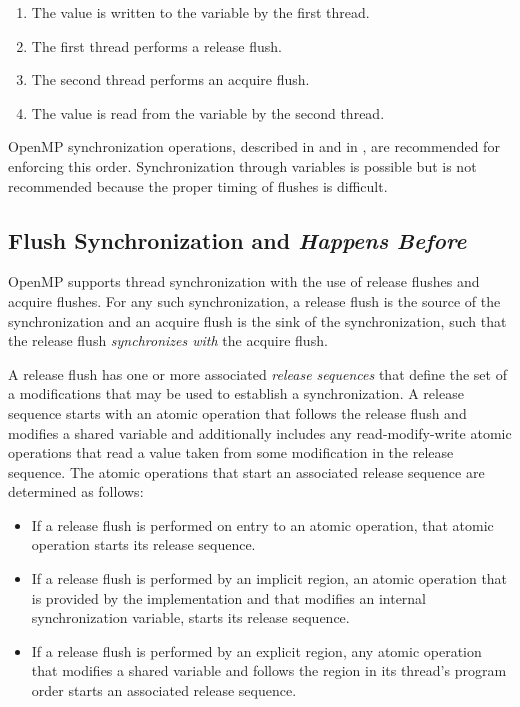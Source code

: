 \begin{enumerate}
    \item The value is written to the variable by the first thread.
    \item The first thread performs a release flush.
    \item The second thread performs an acquire flush.
    \item The value is read from the variable by the second thread.
\end{enumerate}

\begin{note}
OpenMP synchronization operations, described in 
 and in 
, are recommended for enforcing this 
order. Synchronization through variables is possible but is not 
recommended because the proper timing of flushes is difficult.
\end{note}


\subsection{Flush Synchronization and \emph{Happens Before}}
\label{subsec:happens-before}

OpenMP supports thread synchronization with the use of release flushes and
acquire flushes. For any such synchronization, a release flush is the source
of the synchronization and an acquire flush is the sink of the
synchronization, such that the release flush \emph{synchronizes with} the
acquire flush.

A release flush has one or more associated \emph{release sequences} that
define the set of a modifications that may be used to establish a
synchronization. A release sequence starts with an atomic operation
that follows the release flush and modifies a shared variable and additionally
includes any read-modify-write atomic operations that read a value taken from
some modification in the release sequence. The atomic operations that start an
associated release sequence are determined as follows:

\begin{itemize}
\item If a release flush is performed on entry to an atomic operation, that
    atomic operation starts its release sequence.
\item If a release flush is performed by an implicit  region, an 
    atomic operation that is provided by the implementation and that modifies
    an internal synchronization variable, starts its release sequence.
\item If a release flush is performed by an explicit  region, any
    atomic operation that modifies a shared variable and follows the
     region in its thread's program order starts an associated
    release sequence.
\end{itemize}

